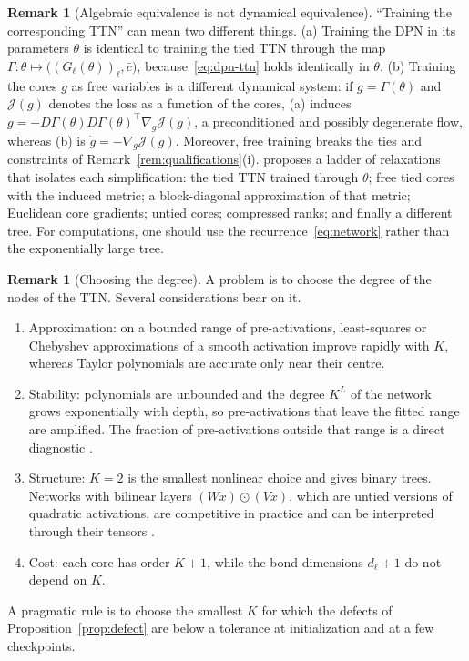 \documentclass[11pt]{article}
\newcommand{\cb}{\bar{c}}
\theoremstyle{definition}
\newtheorem{remark}[theorem]{Remark}
\numberwithin{equation}{section}
\begin{document}
\begin{remark}[Algebraic equivalence is not dynamical equivalence]\label{rem:algebraic-dynamic}
``Training the corresponding TTN'' can mean two different things. (a) Training the DPN in its parameters $\theta$ is identical to training the tied TTN through the map $\Gamma:\theta\mapsto\big((G_\ell(\theta))_\ell,\cb\big)$, because~\eqref{eq:dpn-ttn} holds identically in $\theta$. (b) Training the cores $g$ as free variables is a different dynamical system: if $g=\Gamma(\theta)$ and $\mathcal J(g)$ denotes the loss as a function of the cores, (a) induces $\dot g=-D\Gamma(\theta)D\Gamma(\theta)^\top\nabla_g\mathcal J(g)$, a preconditioned and possibly degenerate flow, whereas (b) is $\dot g=-\nabla_g\mathcal J(g)$. Moreover, free training breaks the ties and constraints of Remark~\ref{rem:qualifications}(i). \citet[Section~4.1]{hfl_surrogate} proposes a ladder of relaxations that isolates each simplification: the tied TTN trained through $\theta$; free tied cores with the induced metric; a block-diagonal approximation of that metric; Euclidean core gradients; untied cores; compressed ranks; and finally a different tree. For computations, one should use the recurrence~\eqref{eq:network} rather than the exponentially large tree.
\end{remark}

\begin{remark}[Choosing the degree]\label{rem:degree}
A problem is to choose the degree of the nodes of the TTN. Several considerations bear on it.
\begin{enumerate}[label=(\roman*),nosep]
\item Approximation: on a bounded range of pre-activations, least-squares or Chebyshev approximations of a smooth activation improve rapidly with $K$, whereas Taylor polynomials are accurate only near their centre.
\item Stability: polynomials are unbounded and the degree $K^L$ of the network grows exponentially with depth, so pre-activations that leave the fitted range are amplified. The fraction of pre-activations outside that range is a direct diagnostic \citep[Section~8.8]{hfl_surrogate}.
\item Structure: $K=2$ is the smallest nonlinear choice and gives binary trees. Networks with bilinear layers $(Wx)\odot(Vx)$, which are untied versions of quadratic activations, are competitive in practice and can be interpreted through their tensors \citep{pearce2024bilinear}.
\item Cost: each core has order $K+1$, while the bond dimensions $d_\ell+1$ do not depend on $K$.
\end{enumerate}
A pragmatic rule is to choose the smallest $K$ for which the defects of Proposition~\ref{prop:defect} are below a tolerance at initialization and at a few checkpoints.
\end{remark}
\end{document}

